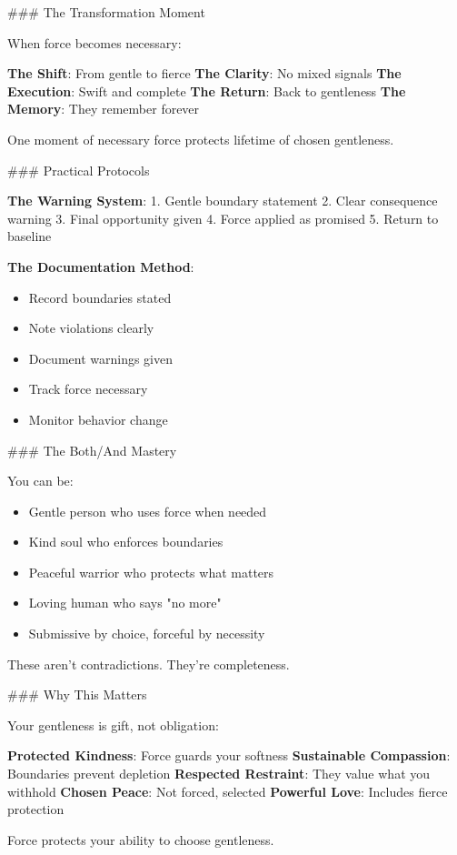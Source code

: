 \documentclass[12pt]{book}
\begin{document}
\#\#\# The Transformation Moment

When force becomes necessary:

\textbf{The Shift}: From gentle to fierce
\textbf{The Clarity}: No mixed signals
\textbf{The Execution}: Swift and complete
\textbf{The Return}: Back to gentleness
\textbf{The Memory}: They remember forever

One moment of necessary force protects lifetime of chosen gentleness.

\#\#\# Practical Protocols

\textbf{The Warning System}:
1. Gentle boundary statement
2. Clear consequence warning
3. Final opportunity given
4. Force applied as promised
5. Return to baseline

\textbf{The Documentation Method}:
\begin{itemize}
\item Record boundaries stated
\item Note violations clearly
\item Document warnings given
\item Track force necessary
\item Monitor behavior change

\end{itemize}
\#\#\# The Both/And Mastery

You can be:
\begin{itemize}
\item Gentle person who uses force when needed
\item Kind soul who enforces boundaries
\item Peaceful warrior who protects what matters
\item Loving human who says "no more"
\item Submissive by choice, forceful by necessity

\end{itemize}
These aren't contradictions. They're completeness.

\#\#\# Why This Matters

Your gentleness is gift, not obligation:

\textbf{Protected Kindness}: Force guards your softness
\textbf{Sustainable Compassion}: Boundaries prevent depletion
\textbf{Respected Restraint}: They value what you withhold
\textbf{Chosen Peace}: Not forced, selected
\textbf{Powerful Love}: Includes fierce protection

Force protects your ability to choose gentleness.
\end{document}
